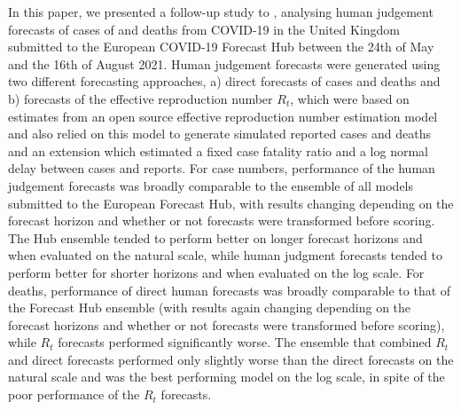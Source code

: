 \documentclass[10pt,a4paper,twocolumn]{article}
\begin{document}
In this paper, we presented a follow-up study to \cite{bosseComparingHumanModelbased2022}, analysing human judgement forecasts of cases of and deaths from COVID-19 in the United Kingdom submitted to the European COVID-19 Forecast Hub between the 24th of May and the 16th of August 2021. Human judgement forecasts were generated using two different forecasting approaches, a) direct forecasts of cases and deaths and b) forecasts of the effective reproduction number $R_t$, which were based on estimates from an open source effective reproduction number estimation model and also relied on this model to generate simulated reported cases and deaths and an extension which estimated a fixed case fatality ratio and a log normal delay between cases and reports. For case numbers, performance of the human judgement forecasts was broadly comparable to the ensemble of all models submitted to the European Forecast Hub, with results changing depending on the forecast horizon and whether or not forecasts were transformed before scoring. The Hub ensemble tended to perform better on longer forecast horizons and when evaluated on the natural scale, while human judgment forecasts tended to perform better for shorter horizons and when evaluated on the log scale. 
For deaths, performance of direct human forecasts was broadly comparable to that of the Forecast Hub ensemble (with results again changing depending on the forecast horizons and whether or not forecasts were transformed before scoring), while $R_t$ forecasts performed significantly worse. The ensemble that combined $R_t$ and direct forecasts performed only slightly worse than the direct forecasts on the natural scale and was the best performing model on the log scale, in spite of the poor performance of the $R_t$ forecasts.  

\end{document}
